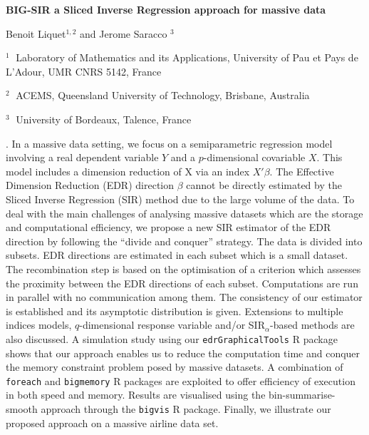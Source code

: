 \documentclass[12pt]{article}
\begin{document}
\begin{flushleft}


{\LARGE\bf BIG-SIR a Sliced Inverse Regression approach for
massive data}


\vspace{0.4cm}

Benoit  Liquet$^{1,2}$ and Jerome Saracco $^3$

\begin{description}
\vspace{-0.2cm}
\item $^1 \;$ Laboratory of Mathematics and its Applications, University of Pau et Pays de L'Adour, UMR CNRS 5142, France

\vspace{-0.2cm}
\item $^2 \;$ ACEMS, Queensland University of Technology, Brisbane, Australia
\vspace{-0.2cm}

\item $^3 \;$ University of  Bordeaux, Talence, France


\end{description}

\end{flushleft}


\vspace{-0.1cm}

. 
In a massive data setting, we  focus on a  semiparametric regression model involving a real dependent variable $Y$ and a $p$-dimensional covariable $X$. This model includes a dimension reduction of X via an index $X'\beta$. The Effective Dimension Reduction (EDR) direction $\beta$ cannot be directly estimated by the Sliced Inverse Regression (SIR) method due to the large volume of the data. To deal with the main challenges of analysing massive datasets which are the storage and computational efficiency, we propose a new SIR estimator of the EDR direction by following the ``divide and conquer'' strategy. The data is divided into subsets.  EDR directions are estimated in each subset which is a small dataset. The recombination step is based on the  optimisation of a criterion which assesses the proximity between the EDR directions of each subset.  Computations are run in parallel with no communication among them.  The consistency of our estimator is established and its asymptotic distribution is given. Extensions to multiple indices models, $q$-dimensional response variable and/or SIR$_{\alpha}$-based methods are also discussed. A simulation study using our \texttt{edrGraphicalTools} R package shows that our approach enables us to reduce the computation time and conquer the memory constraint problem posed by massive datasets. A combination of \texttt{foreach} and \texttt{bigmemory} R packages are exploited to offer efficiency of execution in both speed and memory. Results are visualised using the bin-summarise-smooth approach through the \texttt{bigvis} R package. Finally, we illustrate our proposed approach on a massive airline data set.
\end{document}
